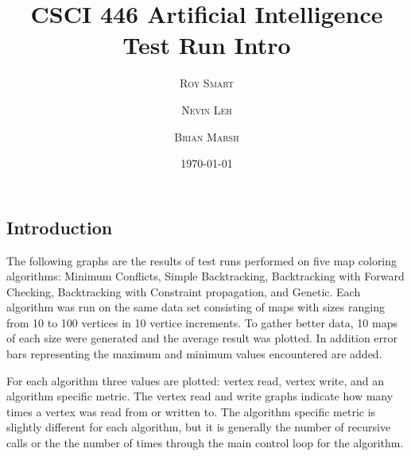 \documentclass{article}
\title{\vspace{-15mm}\fontsize{24pt}{10pt}\selectfont\textbf{CSCI 446 Artificial Intelligence \\ Test Run Intro} \\[-2mm]} %
\date{\today}
\author{
\large
\textsc{Roy Smart} \and \textsc{Nevin Leh} \and \textsc{Brian Marsh}\\[2mm] %
}
\begin{document}
\maketitle %

\thispagestyle{fancy} %



\begin{multicols}{2} %
\normalsize
\section{Introduction}
The following graphs are the results of test runs performed on five map coloring algorithms: Minimum Conflicts, Simple Backtracking, Backtracking with Forward Checking, Backtracking with Constraint propagation, and
Genetic. Each algorithm was run on the same data set consisting of maps with sizes ranging from 10 to 100 vertices in 10 vertice increments. To gather better data, 10 maps of each size were generated and the average result was plotted. In addition error bars representing the maximum and minimum values encountered are added.

For each algorithm three values are plotted: vertex read, vertex write, and an algorithm specific metric. The vertex read and write graphs indicate how many times a vertex was read from or written to. The algorithm specific metric is slightly different for each algorithm, but it is generally the number of recursive calls or the the number of times through the main control loop for the algorithm. 


\end{multicols}
\end{document}
